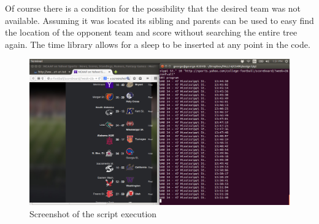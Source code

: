 Of course there is a condition for the possibility that the desired team was not available. Assuming it was located its sibling and parents can be used to easy find the location of the opponent team and score without searching the entire tree again. 
The time library allows for a sleep to be inserted at any point in the code.  








\begin{figure}
\includegraphics[width=\textwidth]{figures/scoreScreen}
 \caption{Screenshot of the script execution}
\end{figure}
